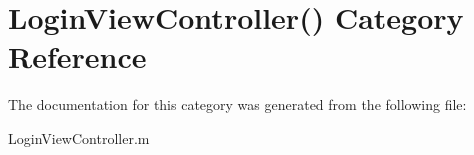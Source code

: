 \hypertarget{category_login_view_controller_07_08}{}\section{Login\+View\+Controller() Category Reference}
\label{category_login_view_controller_07_08}


The documentation for this category was generated from the following file\+:\begin{DoxyCompactItemize}
\item 
Login\+View\+Controller.\+m\end{DoxyCompactItemize}
